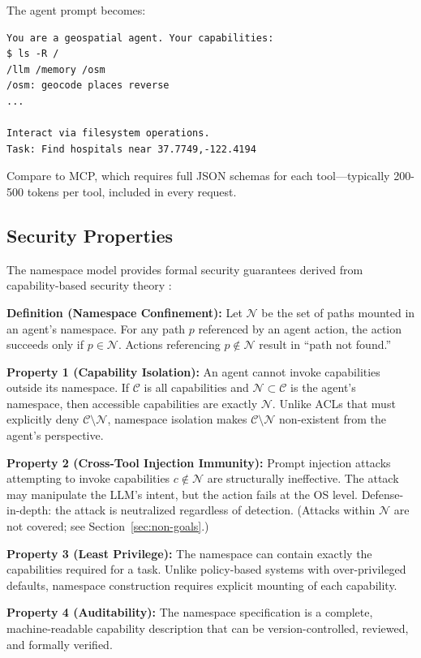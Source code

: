 \documentclass{article}
\begin{document}
The agent prompt becomes:

\begin{lstlisting}
You are a geospatial agent. Your capabilities:
$ ls -R /
/llm /memory /osm
/osm: geocode places reverse
...

Interact via filesystem operations.
Task: Find hospitals near 37.7749,-122.4194
\end{lstlisting}

Compare to MCP, which requires full JSON schemas for each tool---typically 200-500 tokens per tool, included in every request.

\subsection{Security Properties}

The namespace model provides formal security guarantees derived from capability-based security theory \cite{miller2006capability}:

\textbf{Definition (Namespace Confinement):} Let $\mathcal{N}$ be the set of paths mounted in an agent's namespace. For any path $p$ referenced by an agent action, the action succeeds only if $p \in \mathcal{N}$. Actions referencing $p \notin \mathcal{N}$ result in ``path not found.''

\textbf{Property 1 (Capability Isolation):} An agent cannot invoke capabilities outside its namespace. If $\mathcal{C}$ is all capabilities and $\mathcal{N} \subset \mathcal{C}$ is the agent's namespace, then accessible capabilities are exactly $\mathcal{N}$. Unlike ACLs that must explicitly deny $\mathcal{C} \setminus \mathcal{N}$, namespace isolation makes $\mathcal{C} \setminus \mathcal{N}$ non-existent from the agent's perspective.

\textbf{Property 2 (Cross-Tool Injection Immunity):} Prompt injection attacks attempting to invoke capabilities $c \notin \mathcal{N}$ are structurally ineffective. The attack may manipulate the LLM's intent, but the action fails at the OS level. Defense-in-depth: the attack is neutralized regardless of detection. (Attacks within $\mathcal{N}$ are not covered; see Section~\ref{sec:non-goals}.)

\textbf{Property 3 (Least Privilege):} The namespace can contain exactly the capabilities required for a task. Unlike policy-based systems with over-privileged defaults, namespace construction requires explicit mounting of each capability.

\textbf{Property 4 (Auditability):} The namespace specification is a complete, machine-readable capability description that can be version-controlled, reviewed, and formally verified.
\end{document}
